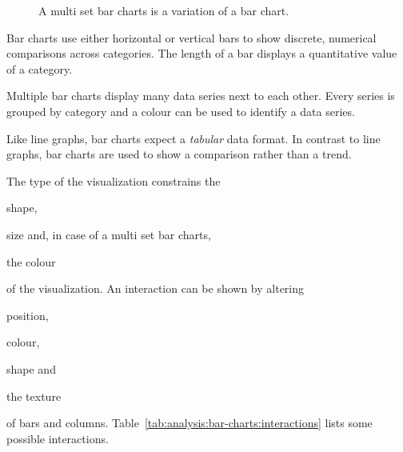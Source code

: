 \begin{figure}
  \begin{center}
    \qquad
    \caption{A multi set bar charts is a variation of a bar chart.}
    \label{fig:analysis:bar-charts}
  \end{center}
\end{figure}

Bar charts use either horizontal or vertical bars to show discrete, numerical comparisons across categories.
The length of a bar displays a quantitative value of a category.

Multiple bar charts display many data series next to each other.
Every series is grouped by category and a colour can be used to identify a data series.

Like line graphs, bar charts expect a \emph{tabular} data format.
In contrast to line graphs, bar charts are used to show a comparison rather than a trend.

The type of the visualization constrains the
\begin{enumerate*}[label=(\arabic*)]
    \item shape,
    \item size and, in case of a multi set bar charts,
    \item the colour
\end{enumerate*}
of the visualization.
An interaction can be shown by altering
\begin{enumerate*}[label=(\arabic*)]
    \item position,
    \item colour,
    \item shape and
    \item the texture
\end{enumerate*}
of bars and columns.
Table~\ref{tab:analysis:bar-charts:interactions} lists some possible interactions.


